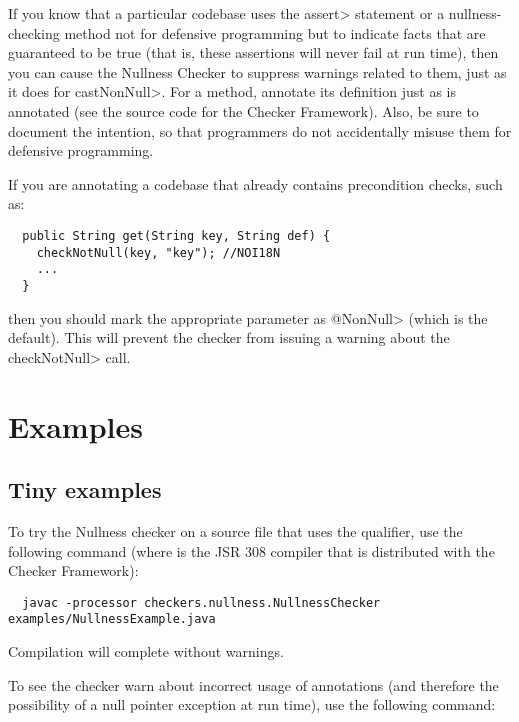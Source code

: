 If you know that a particular codebase uses the \<assert> statement or a
nullness-checking method not for defensive programming but to indicate
facts that are guaranteed to be true (that is, these assertions will never
fail at run time), then you can cause the Nullness Checker to suppress
warnings related to them, just as it does for \<castNonNull>.  For a
method, annotate its definition just as
 is annotated (see the
source code for the Checker Framework).
Also, be sure to document the intention, so that programmers do not
accidentally misuse them for defensive programming.


If you are annotating a codebase that already contains precondition checks,
such as:

\begin{Verbatim}
  public String get(String key, String def) {
    checkNotNull(key, "key"); //NOI18N
    ...
  }
\end{Verbatim}

\noindent
then you should mark the appropriate parameter as \<@NonNull> (which is the
default).  This will prevent the checker from issuing a warning about the
\<checkNotNull> call.


\section{Examples\label{nullness-example}}

\subsection{Tiny examples\label{nullness-tiny-examples}}

To try the Nullness checker on a source file that uses the  qualifier,
use the following command (where  is the JSR 308 compiler that
is distributed with the Checker Framework):

\begin{Verbatim}
  javac -processor checkers.nullness.NullnessChecker examples/NullnessExample.java
\end{Verbatim}

\noindent
Compilation will complete without warnings.

To see the checker warn about incorrect usage of annotations (and therefore the
possibility of a null pointer exception at run time), use the following command:

